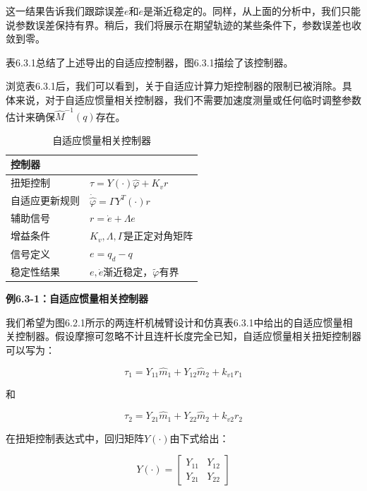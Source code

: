 \documentclass[12pt,a4paper]{ctexart}
\begin{document}
这一结果告诉我们跟踪误差$e$和$\dot{e}$是渐近稳定的。同样，从上面的分析中，我们只能说参数误差保持有界。稍后，我们将展示在期望轨迹的某些条件下，参数误差也收敛到零。

表6.3.1总结了上述导出的自适应控制器，图6.3.1描绘了该控制器。

浏览表6.3.1后，我们可以看到，关于自适应计算力矩控制器的限制已被消除。具体来说，对于自适应惯量相关控制器，我们不需要加速度测量或任何临时调整参数估计来确保$\hat{M}^{-1}(q)$存在。

\begin{table}[H]
\centering
\caption{自适应惯量相关控制器}
\begin{tabular}{|l|l|}
\hline
\textbf{控制器} & \\ \hline
扭矩控制 & $\tau = Y(\cdot)\hat{\varphi} + K_v r$ \\ \hline
自适应更新规则 & $\dot{\hat{\varphi}} = \Gamma Y^T(\cdot)r$ \\ \hline
辅助信号 & $r = \dot{e} + \Lambda e$ \\ \hline
增益条件 & $K_v, \Lambda, \Gamma$是正定对角矩阵 \\ \hline
信号定义 & $e = q_d - q$ \\ \hline
稳定性结果 & $e, \dot{e}$渐近稳定，$\tilde{\varphi}$有界 \\ \hline
\end{tabular}
\end{table}

\textbf{例6.3-1：自适应惯量相关控制器}

我们希望为图6.2.1所示的两连杆机械臂设计和仿真表6.3.1中给出的自适应惯量相关控制器。假设摩擦可忽略不计且连杆长度完全已知，自适应惯量相关扭矩控制器可以写为：

\begin{equation}
\tau_1 = Y_{11}\hat{m}_1 + Y_{12}\hat{m}_2 + k_{v1}r_1
\end{equation}

和

\begin{equation}
\tau_2 = Y_{21}\hat{m}_1 + Y_{22}\hat{m}_2 + k_{v2}r_2
\end{equation}

在扭矩控制表达式中，回归矩阵$Y(\cdot)$由下式给出：

\begin{equation}
Y(\cdot) = \begin{bmatrix} Y_{11} & Y_{12} \\ Y_{21} & Y_{22} \end{bmatrix}
\end{equation}
\end{document}
